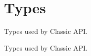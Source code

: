 \hypertarget{group__ClassicTypes}{}\section{Types}
\label{group__ClassicTypes}


Types used by Classic A\+PI.  


Types used by Classic A\+PI. 

